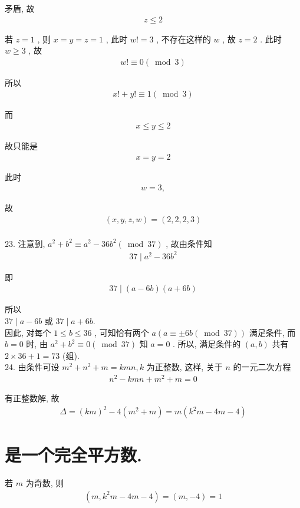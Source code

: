 矛盾, 故
\begin{align*}
	z \leqslant 2
\end{align*}

若 $z=1$ , 则 $x=y=z=1$ , 此时 $w!=3$ , 不存在这样的 $w$ , 故 $z=2$ . 此时 $w \geqslant 3$ , 故
\begin{align*}
	w!\equiv 0(\bmod 3)
\end{align*}

所以
\begin{align*}
	x!+y!\equiv 1(\bmod 3)
\end{align*}

而
\begin{align*}
	x \leqslant y \leqslant 2
\end{align*}

故只能是
\begin{align*}
	x=y=2
\end{align*}

此时
\begin{align*}
	w=3,
\end{align*}

故
\begin{align*}
	(x, y, z, w)=(2,2,2,3)
\end{align*}\\
23. 注意到, $a^{2}+b^{2} \equiv a^{2}-36 b^{2}(\bmod 37)$ , 故由条件知
\begin{align*}
	37 \mid a^{2}-36 b^{2}
\end{align*}

即
\begin{align*}
	37 \mid(a-6 b)(a+6 b)
\end{align*}

所以\\
$37 \mid a-6 b$ 或 $37 \mid a+6 b$.\\
因此, 对每个 $1 \leqslant b \leqslant 36$ , 可知恰有两个 $a(a \equiv \pm 6 b(\bmod 37))$ 满足条件, 而 $b=0$ 时, 由 $a^{2}+b^{2} \equiv 0(\bmod 37)$ 知 $a=0$ . 所以, 满足条件的 $(a, b)$ 共有 $2 \times 36+1=73$ (组). \\
24. 由条件可设 $m^{2}+n^{2}+m=k m n, k$ 为正整数, 这样, 关于 $n$ 的一元二次方程
\begin{align*}
	n^{2}-k m n+m^{2}+m=0
\end{align*}

有正整数解, 故
\begin{align*}
	\Delta=(k m)^{2}-4\left(m^{2}+m\right)=m\left(k^{2} m-4 m-4\right)
\end{align*}

\section{是一个完全平方数. }
若 $m$ 为奇数, 则
\begin{align*}
	\left(m, k^{2} m-4 m-4\right)=(m,-4)=1
\end{align*}

